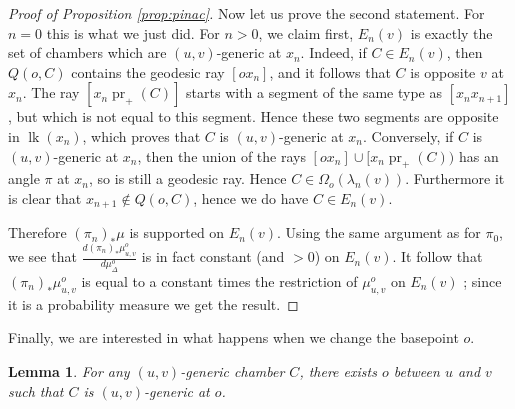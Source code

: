 \documentclass[a4paper, 11pt]{article}
\theoremstyle{plain}
\newtheorem{lemma}[proposition]{Lemma}
\theoremstyle{definition}
\theoremstyle{remark}
\DeclareMathOperator{\pr}{pr}
\DeclareMathOperator{\lk}{lk}
\begin{document}
\begin{proof}[Proof of Proposition \ref{prop:pinac}]
Now let us prove the second statement. For $n=0$ this is what we just did. For $n>0$, we claim first, $E_n(v)$ is exactly the set of chambers which are $(u,v)$-generic at $x_n$. Indeed, if $C\in E_n(v)$, then $Q(o,C)$ contains the geodesic ray $[o x_n]$, and it follows that $C$ is opposite $v$ at $x_n$. The ray $[x_n \pr_+(C)]$ starts with a segment of the same type as $[x_n x_{n+1}]$, but which is not equal to this segment. Hence these two segments are opposite in $\lk(x_n)$, which proves that $C$ is $(u,v)$-generic at $x_n$. Conversely, if $C$ is $(u,v)$-generic at $x_n$, then the union of the rays $[o x_n]\cup[x_n \pr_+(C)) $ has an angle $\pi$ at $x_n$, so is still a geodesic ray. Hence $C\in \Omega_o(\lambda_n(v))$. Furthermore it is clear that $x_{n+1}\not\in Q(o,C)$, hence we do have $C\in E_n(v)$.

Therefore $(\pi_n)_*\mu$ is supported on $E_n(v)$. Using the same argument as for $\pi_0$, we see that $\frac{d(\pi_n)_*\mu_{u,v}^o}{d\mu_\Delta^o}$ is in fact constant (and $>0$) on $E_n(v)$. It follow that $(\pi_n)_*\mu_{u,v}^o$ is equal to a constant times the restriction of $\mu_{u,v}^o$ on $E_n(v)$ ; since it is a probability measure we get the result.

\end{proof}

Finally, we are interested in what happens when we change the basepoint $o$.

\begin{lemma}\label{lem:uvgeneric}
For any $(u,v)$-generic chamber $C$, there exists $o$ between $u$ and $v$ such that $C$ is $(u,v)$-generic at $o$.
\end{lemma}
\end{document}
